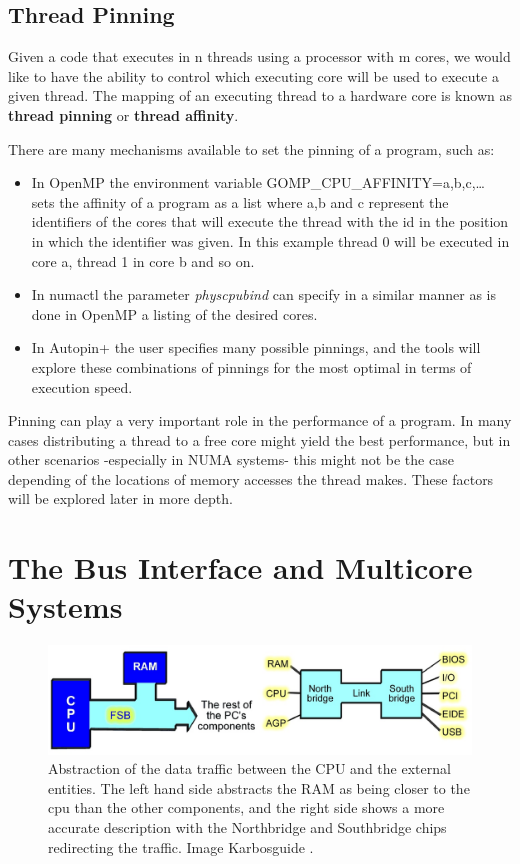 \subsection{Thread Pinning}\label{subsection:pinning}
Given a code that executes in n threads using a processor with m cores, we would like to have the ability to control which executing core will be used to execute a given thread. The mapping of an executing thread to a hardware core is known as \textbf{thread pinning} or \textbf{thread affinity}.

There are many mechanisms available to set the pinning of a program, such as:

\begin{itemize}
	\item In OpenMP the environment variable GOMP\_CPU\_AFFINITY=a,b,c,… sets the affinity of a program as a list where a,b and c represent the identifiers of the cores that will execute the thread with the id in the position in which the identifier was given. In this example thread 0 will be executed in core a, thread 1 in core b and so on.
	\item In numactl the parameter \textit{physcpubind} can specify in a similar manner as is done in OpenMP a listing of the desired cores.
	\item In Autopin+ the user specifies many possible pinnings, and the tools will explore these combinations of pinnings for the most optimal in terms of execution speed.
\end{itemize}
Pinning can play a very important role in the performance of a program. In many cases distributing a thread to a free core might yield the best performance, but in other scenarios -especially in NUMA systems- this might not be the case depending of the locations of memory accesses the thread makes. These factors will be explored later in more depth. 

\section{The Bus Interface and Multicore Systems}\label{section:businterface}
\begin{figure}[ht]
	\centering
		\includegraphics[width=.9\textwidth]{figures/bus-abstraction.eps}
		\caption[Abstraction of the data traffic between the CPU and the external entities]{Abstraction of the data traffic between the CPU and the external entities. The left hand side abstracts the RAM as being closer to the cpu than the other components, and the right side shows a more accurate description with the Northbridge and Southbridge chips redirecting the traffic. Image Karbosguide \cite{pcarch-carbo}. }
		\label{fig:bus-abs}
\end{figure}

